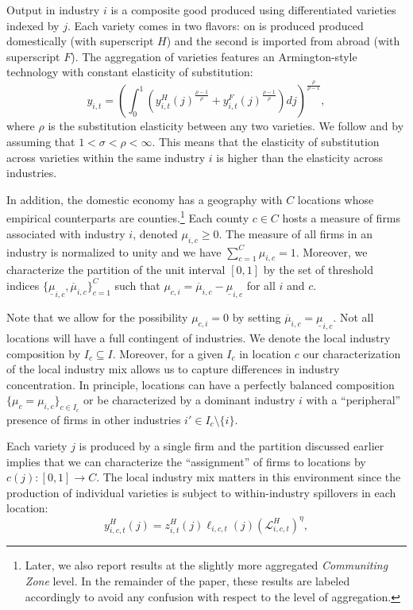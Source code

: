 \documentclass[onehalfspacing,11pt]{article}
\begin{document}
Output in industry $i$ is a composite good produced using differentiated varieties indexed by $j$. Each variety comes in two flavors: on is produced produced domestically (with superscript $H$) and the second is imported from abroad (with superscript $F$). The aggregation of varieties features an Armington-style technology with constant elasticity of substitution:
\begin{equation}
\label{eq:yi}
y_{i,t} = \left( \int_{0}^1 \left( {y^H_{i,t}(j)}^{\frac{\rho-1}{\rho}} + {y^F_{i,t}(j)}^{\frac{\rho-1}{\rho}} \right) dj\right)^{\frac{\rho}{\rho-1}},
\end{equation}
where $\rho$ is the substitution elasticity between any two varieties. We follow \cite{Atkeson:2008} and \cite{Edmond:2015} by assuming that $1 < \sigma < \rho < \infty$. This means that the elasticity of substitution across varieties within the same industry $i$ is higher than the elasticity across industries.

In addition, the domestic economy has a geography with $C$ locations whose empirical counterparts are counties.\footnote{Later, we also report results at the slightly more aggregated \textit{Communiting Zone} level. In the remainder of the paper, these results are labeled accordingly to avoid any confusion with respect to the level of aggregation.} Each county $c \in C$ hosts a measure of firms associated with industry $i$, denoted $\mu_{i,c} \geq 0$. The measure of all firms in an industry is normalized to unity and we have $\sum_{c=1}^C \mu_{i,c} = 1$. Moreover, we characterize the partition of the unit interval $[0,1]$ by the set of threshold indices $\{ \underline{\mu}_{i,c},\overline{\mu}_{i,c} \}_{c=1}^C$ such that $\mu_{c,i} = \overline{\mu}_{i,c} - \underline{\mu}_{i,c}$ for all $i$ and $c$. 

Note that we allow for the possibility $\mu_{c,i} = 0$ by setting $\overline{\mu}_{i,c} = \underline{\mu}_{i,c}$. Not all locations will have a full contingent of industries. We denote the local industry composition by $I_c \subseteq I$. Moreover, for a given $I_c$ in location $c$ our characterization of the local industry mix allows us to capture differences in industry concentration. In principle, locations can have a perfectly balanced composition $\{ \mu_c = \mu_{i,c} \}_{c \in I_c}$ or be characterized by a dominant industry $i$ with a ``peripheral'' presence of firms in other industries $i' \in I_c \setminus \{ i \}$.

Each variety $j$ is produced by a single firm and the partition discussed earlier implies that we can characterize the ``assignment'' of firms to locations by $c(j): [0,1] \rightarrow C$. The local industry mix matters in this environment since the production of individual varieties is subject to within-industry spillovers in each location:
\begin{equation}
\label{ }
y_{i,c,t}^H(j) = z_{i,t}^H(j) \ell_{i,c,t}(j) \left( \mathcal{L}_{i,c,t}^H \right)^\eta, %
\end{equation}
\end{document}
